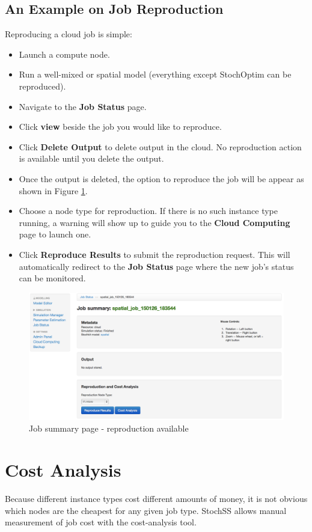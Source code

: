 \subsection{An Example on Job Reproduction}
Reproducing a cloud job is simple:

\begin{itemize}
\item Launch a compute node.
\item Run a well-mixed or spatial model (everything except StochOptim can be reproduced).
\item Navigate to the \textbf{Job Status} page.
\item Click \textbf{view} beside the job you would like to reproduce.
\item Click \textbf{Delete Output} to delete output in the cloud. No reproduction action is available until you delete the output.
\item Once the output is deleted, the option to reproduce the job will be appear as shown in Figure \ref{fig:3}.
\item Choose a node type for reproduction. If there is no such instance type running, a warning will show up to guide you to the \textbf{Cloud Computing} page to launch one.
\item Click \textbf{Reproduce Results} to submit the reproduction request. This will automatically redirect to the \textbf{Job Status} page where the new job's status can be monitored.
\end{itemize}

\begin{figure}[!ht]
\centering
\includegraphics[scale=0.35]{T6/T6_fig_reproduction1.png}
\caption{Job summary page - reproduction available}
\label{fig:3}
\end{figure}

\section{Cost Analysis}
Because different instance types cost different amounts of money, it is not obvious which nodes are the cheapest for any given job type. StochSS allows manual measurement of job cost with the cost-analysis tool.


